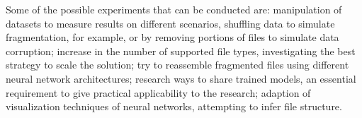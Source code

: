 Some of the possible experiments that can be conducted are:
%
manipulation of datasets to measure results on different scenarios,  shuffling data to simulate fragmentation, for example, or by removing portions of files to simulate data corruption;
%
increase in the number of supported file types, investigating the best strategy to scale the solution;
%
try to reassemble fragmented files using different neural network architectures;
%
research ways to share trained models, an essential requirement to give practical applicability to the research;
%
adaption of visualization techniques of neural networks, attempting to infer file structure.

